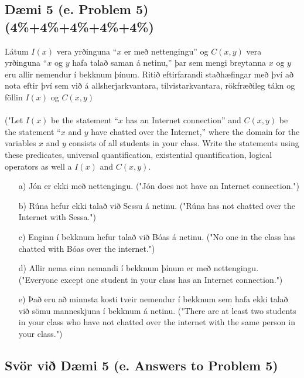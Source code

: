 \newpage
\subsection*{Dæmi 5 (e. Problem 5) (4\%+4\%+4\%+4\%+4\%) \label{section:daemi5}}
Látum $I(x)$ vera yrðinguna “$x$ er með nettengingu” og $C(x, y)$ vera yrðinguna “$x$ og $y$ hafa talað saman á netinu,” þar sem mengi breytanna $x$ og $y$ eru allir nemendur í bekknum þínum. Ritið eftirfarandi staðhæfingar með því að nota eftir því sem við á allsherjarkvantara, tilvistarkvantara, rökfræðileg tákn og föllin $I(x)$ og $C(x,y)$\\
\\
("Let $I(x)$ be the statement “$x$ has an Internet connection” and $C(x, y)$ be the statement “$x$ and $y$ have chatted over the Internet,” where the domain for the variables $x$ and $y$ consists of all students in your class. Write the statements using these predicates, universal quantification, existential quantification, logical operators as well a $I(x)$ and $C(x,y)$.

\begin{itemize}
    \item[a)] Jón er ekki með nettengingu. ("Jón does not have an Internet connection.")
    \item[b)] Rúna hefur ekki talað við Sessu á netinu. ("Rúna has not chatted over the Internet with Sessa.")
    \item[c)] Enginn í bekknum hefur talað við Bóas á netinu. ("No one in the class has chatted with Bóas over the internet.")
    \item[d)] Allir nema einn nemandi í bekknum þínum er með nettengingu. ("Everyone except one student in your class has an Internet connection.")
    \item[e)] Það eru að minnsta kosti tveir nemendur í bekknum sem hafa ekki talað við sömu manneskjuna í bekknum á netinu.
    ("There are at least two students in your class who have not chatted over the internet with the same person in your class.")
\end{itemize}

\subsection*{Svör við Dæmi 5 (e. Answers to Problem 5)}

\newcommand{\makeAnswerBoxProblemFiveA}{
  \begin{tcolorbox}[colframe=black, colback=white, boxrule=0.5pt, arc=0pt, outer arc=0pt, height=1.8cm, width=\linewidth, top=1mm, bottom=1mm, left=1mm, right=1mm]

  \end{tcolorbox}
}

